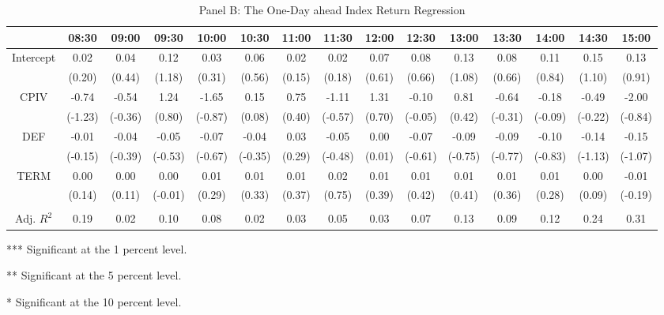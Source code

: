 \begin{table}[h]
\begin{threeparttable}
\medskip
\begin{subtable}[t]{\linewidth}

\caption{Panel B: The One-Day ahead Index Return Regression }
\tiny
\begin{tabular}{ccccccccccccccc}
\toprule
          & 08:30   & 09:00   & 09:30   & 10:00   & 10:30   & 11:00  & 11:30   & 12:00  & 12:30   & 13:00   & 13:30   & 14:00   & 14:30   & 15:00   \\ \midrule
Intercept & 0.02    & 0.04    & 0.12    & 0.03    & 0.06    & 0.02   & 0.02    & 0.07   & 0.08    & 0.13    & 0.08    & 0.11    & 0.15    & 0.13    \\
          & (0.20)  & (0.44)  & (1.18)  & (0.31)  & (0.56)  & (0.15) & (0.18)  & (0.61) & (0.66)  & (1.08)  & (0.66)  & (0.84)  & (1.10)  & (0.91)  \\
CPIV      & -0.74   & -0.54   & 1.24    & -1.65   & 0.15    & 0.75   & -1.11   & 1.31   & -0.10   & 0.81    & -0.64   & -0.18   & -0.49   & -2.00   \\
          & (-1.23) & (-0.36) & (0.80)  & (-0.87) & (0.08)  & (0.40) & (-0.57) & (0.70) & (-0.05) & (0.42)  & (-0.31) & (-0.09) & (-0.22) & (-0.84) \\
DEF       & -0.01   & -0.04   & -0.05   & -0.07   & -0.04   & 0.03   & -0.05   & 0.00   & -0.07   & -0.09   & -0.09   & -0.10   & -0.14   & -0.15   \\
          & (-0.15) & (-0.39) & (-0.53) & (-0.67) & (-0.35) & (0.29) & (-0.48) & (0.01) & (-0.61) & (-0.75) & (-0.77) & (-0.83) & (-1.13) & (-1.07) \\
TERM      & 0.00    & 0.00    & 0.00    & 0.01    & 0.01    & 0.01   & 0.02    & 0.01   & 0.01    & 0.01    & 0.01    & 0.01    & 0.00    & -0.01   \\
          & (0.14)  & (0.11)  & (-0.01) & (0.29)  & (0.33)  & (0.37) & (0.75)  & (0.39) & (0.42)  & (0.41)  & (0.36)  & (0.28)  & (0.09)  & (-0.19) \\
          &         &         &         &         &         &        &         &        &         &         &         &         &         &         \\
Adj. $R^{2}$     & 0.19    & 0.02    & 0.10    & 0.08    & 0.02    & 0.03   & 0.05    & 0.03   & 0.07    & 0.13    & 0.09    & 0.12    & 0.24    & 0.31 \\ 
\bottomrule
\end{tabular}

\begin{tablenotes}
\item
\item[***]Significant at the 1 percent level.    
\item[**]Significant at the 5 percent level.   
\item[*]Significant at the 10 percent level.
\end{tablenotes}
\end{subtable}



\end{threeparttable}
\end{table}
